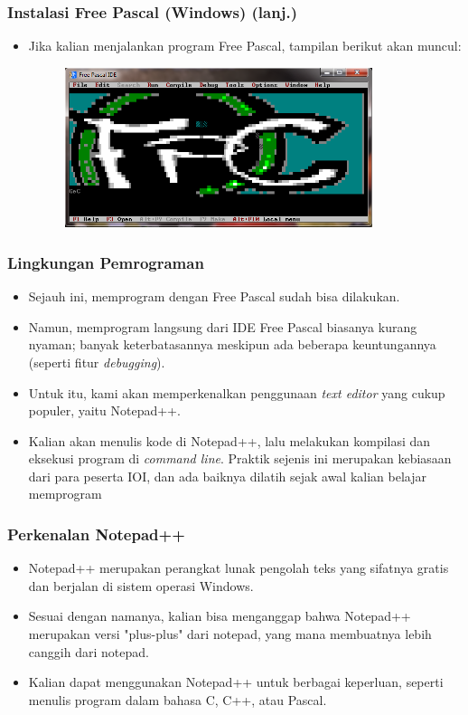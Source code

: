 \documentclass{beamer}
\begin{document}
\begin{frame}
\frametitle{Instalasi Free Pascal (Windows) (lanj.)}
\begin{itemize}
	\item Jika kalian menjalankan program Free Pascal, tampilan berikut akan muncul:
	\begin{figure}
		\includegraphics[width=9cm]{asset/fpc_11.PNG}
	\end{figure}
\end{itemize}
\end{frame}

\begin{frame}
\frametitle{Lingkungan Pemrograman}
\begin{itemize}
	\item Sejauh ini, memprogram dengan Free Pascal sudah bisa dilakukan. 
	\item Namun, memprogram langsung dari IDE Free Pascal biasanya kurang nyaman; banyak keterbatasannya meskipun ada beberapa keuntungannya (seperti fitur \textit{debugging}).
	\item Untuk itu, kami akan memperkenalkan penggunaan \textit{text editor} yang cukup populer, yaitu Notepad++.
	\item Kalian akan menulis kode di Notepad++, lalu melakukan kompilasi dan eksekusi program di \textit{command line}. Praktik sejenis ini merupakan kebiasaan dari para peserta IOI, dan ada baiknya dilatih sejak awal kalian belajar memprogram \text{:)}
\end{itemize}
\end{frame}

\begin{frame}
\frametitle{Perkenalan Notepad++}
\begin{itemize}
	\item Notepad++ merupakan perangkat lunak pengolah teks yang sifatnya gratis dan berjalan di sistem operasi Windows.
	\item Sesuai dengan namanya, kalian bisa menganggap bahwa Notepad++ merupakan versi "plus-plus" dari notepad, yang mana membuatnya lebih canggih dari notepad.
	\item Kalian dapat menggunakan Notepad++ untuk berbagai keperluan, seperti menulis program dalam bahasa C, C++, atau Pascal.
\end{itemize}
\end{frame}
\end{document}
